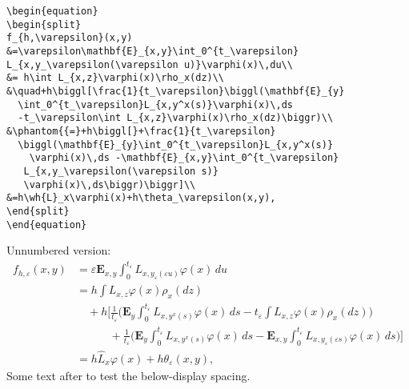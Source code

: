 \documentclass[mlq,fleqn]{w-art}
\newcommand{\wh}{\widehat}
\begin{document}
\begin{verbatim}
\begin{equation}
\begin{split}
f_{h,\varepsilon}(x,y)
&=\varepsilon\mathbf{E}_{x,y}\int_0^{t_\varepsilon}
L_{x,y_\varepsilon(\varepsilon u)}\varphi(x)\,du\\
&= h\int L_{x,z}\varphi(x)\rho_x(dz)\\
&\quad+h\biggl[\frac{1}{t_\varepsilon}\biggl(\mathbf{E}_{y}
  \int_0^{t_\varepsilon}L_{x,y^x(s)}\varphi(x)\,ds
  -t_\varepsilon\int L_{x,z}\varphi(x)\rho_x(dz)\biggr)\\
&\phantom{{=}+h\biggl[}+\frac{1}{t_\varepsilon}
  \biggl(\mathbf{E}_{y}\int_0^{t_\varepsilon}L_{x,y^x(s)}
    \varphi(x)\,ds -\mathbf{E}_{x,y}\int_0^{t_\varepsilon}
   L_{x,y_\varepsilon(\varepsilon s)}
   \varphi(x)\,ds\biggr)\biggr]\\
&=h\wh{L}_x\varphi(x)+h\theta_\varepsilon(x,y),
\end{split}
\end{equation}
\end{verbatim}

\newpage
Unnumbered version:
\begin{equation*}
\begin{split}
f_{h,\varepsilon}(x,y)
&=\varepsilon\mathbf{E}_{x,y}\int_0^{t_\varepsilon}
L_{x,y_\varepsilon(\varepsilon u)}\varphi(x)\,du\\
&= h\int L_{x,z}\varphi(x)\rho_x(dz)\\
&\quad+h\biggl[\frac{1}{t_\varepsilon}\biggl(\mathbf{E}_{y}
  \int_0^{t_\varepsilon}L_{x,y^x(s)}\varphi(x)\,ds
  -t_\varepsilon\int L_{x,z}\varphi(x)\rho_x(dz)\biggr)\\
&\phantom{{=}+h\biggl[}+\frac{1}{t_\varepsilon}
  \biggl(\mathbf{E}_{y}\int_0^{t_\varepsilon}L_{x,y^x(s)}
    \varphi(x)\,ds -\mathbf{E}_{x,y}\int_0^{t_\varepsilon}
   L_{x,y_\varepsilon(\varepsilon s)}
   \varphi(x)\,ds\biggr)\biggr]\\
&=h\wh{L}_x\varphi(x)+h\theta_\varepsilon(x,y),
\end{split}
\end{equation*}
Some text after to test the below-display spacing.
\end{document}

